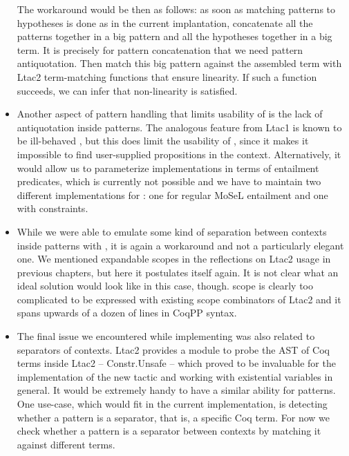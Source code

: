 \begin{itemize}
    The workaround would be then as follows: as soon as matching patterns to hypotheses is done as in the current implantation, concatenate all the patterns together in a big pattern and all the hypotheses together in a big term.
    It is precisely for pattern concatenation that we need pattern antiquotation.
    Then match this big pattern against the assembled term with Ltac2 term-matching functions that ensure linearity.
    If such a function succeeds, we can infer that non-linearity is satisfied.
\item Another aspect of pattern handling that limits usability of  is the lack of  antiquotation inside patterns.
  The analogous feature from Ltac1 is known to be ill-behaved \cite{PatternEvarValue, MultipleOccurrencesSame}, but this does limit the usability of , since it makes it impossible to find user-supplied propositions in the context.
  Alternatively, it would allow us to parameterize implementations in terms of entailment predicates, which is currently not possible and we have to maintain two different implementations for : one for regular MoSeL entailment and one with constraints.
\item While we were able to emulate some kind of separation between contexts inside patterns with \coqe{_ : $\Vert$}, it is again a workaround and not a particularly elegant one.
  We mentioned expandable scopes in the reflections on Ltac2 usage in previous chapters, but here it postulates itself again.
  It is not clear what an ideal solution would look like in this case, though.
   scope is clearly too complicated to be expressed with existing scope combinators of Ltac2 and it spans upwards of a dozen of lines in CoqPP syntax.
\item The final issue we encountered while implementing  was also related to separators of contexts.
  Ltac2 provides a module to probe the AST of Coq terms inside Ltac2 -- Constr.Unsafe -- which proved to be invaluable for the implementation of the new  tactic and working with existential variables in general.
  It would be extremely handy to have a similar ability for patterns.
  One use-case, which would fit in the current implementation, is detecting whether a pattern is a separator, that is, a specific Coq term.
  For now we check whether a pattern is a separator between contexts by matching it against different terms.
\end{itemize}

